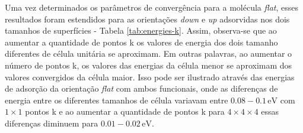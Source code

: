 Uma vez determinados os parâmetros de convergência para a molécula \textit{flat}, esses resultados foram estendidos para as orientações \textit{down} e \textit{up} adsorvidas nos dois tamanhos de superfícies - Tabela \ref{tab:energies-k}. Assim, observa-se que ao aumentar a quantidade de pontos k os valores de energia dos dois tamanho diferentes de célula unitária se aproximam. Em outras palavras, ao aumentar o número de pontos k, os valores das energias da célula menor se aproximam dos valores convergidos da célula maior. Isso pode ser ilustrado através das energias de adsorção da orientação \textit{flat} com ambos funcionais, onde as diferenças de energia entre os diferentes tamanhos de célula variavam entre $ 0.08-0.1\,\si{\eV}$ com $ 1\times1 $ pontos k e ao aumentar a quantidade de pontos k para $ 4\times4\times4 $ essas diferenças diminuem para $ 0.01-0.02\,\si{\eV} $. %
 
